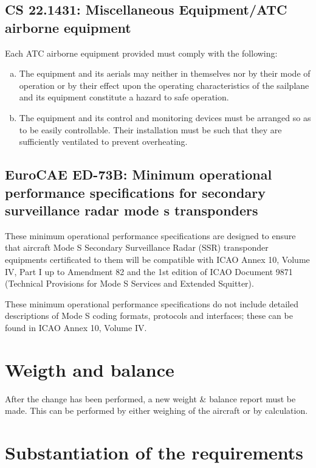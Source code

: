 \documentclass{article}
\begin{document}
\subsection[CS 22.1431]{CS 22.1431:  Miscellaneous Equipment/ATC airborne equipment}
Each ATC airborne equipment provided must comply with the following:
\begin{enumerate}[(a)]
\item The equipment and its aerials may neither in themselves nor by their mode of operation or by their effect upon the operating characteristics of the sailplane and its equipment constitute a hazard to safe operation.
\item The equipment and its control and monitoring devices must be arranged so as to be easily controllable. Their installation must be such that they are sufficiently ventilated to prevent overheating.
\end{enumerate}


\subsection[EuroCAE ED-73B]{EuroCAE ED-73B: Minimum operational performance specifications for secondary surveillance radar mode s transponders}
These minimum operational performance specifications are designed to ensure that aircraft Mode S Secondary Surveillance Radar (SSR) transponder equipments certificated to them will be compatible with ICAO Annex 10, Volume IV, Part I up to Amendment 82 and the 1st edition of ICAO Document 9871 (Technical Provisions for Mode S Services and Extended Squitter). 

These minimum operational performance specifications do not include detailed descriptions of Mode S coding formats, protocols and interfaces; these can be found in ICAO Annex 10, Volume IV. 

\section{Weigth and balance}
After the change has been performed, a new weight \& balance report must be made. This can be performed by either weighing of the aircraft or by calculation.

\section{Substantiation of the requirements}
\end{document}
